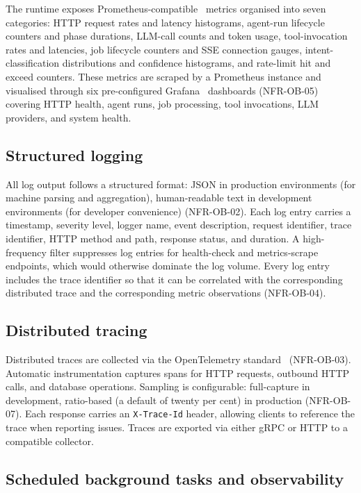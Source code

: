 \documentclass[a4paper,noexaminfo]{sapthesis}
\begin{document}
The runtime exposes Prometheus-compatible~\cite{prometheus2023} metrics
organised into seven categories: HTTP request rates and latency
histograms, agent-run lifecycle counters and phase durations, LLM-call
counts and token usage, tool-invocation rates and latencies, job
lifecycle counters and SSE connection gauges, intent-classification
distributions and confidence histograms, and rate-limit hit and exceed
counters.  These metrics are scraped by a Prometheus instance and
visualised through six pre-configured Grafana~\cite{grafana2023}
dashboards (NFR-OB-05) covering HTTP health, agent runs, job processing,
tool invocations, LLM providers, and system health.

\subsection{Structured logging}

All log output follows a structured format: JSON in production
environments (for machine parsing and aggregation), human-readable text in
development environments (for developer convenience) (NFR-OB-02).  Each
log entry carries a timestamp, severity level, logger name, event
description, request identifier, trace identifier, HTTP method and path,
response status, and duration.  A high-frequency filter suppresses log
entries for health-check and metrics-scrape endpoints, which would
otherwise dominate the log volume.  Every log entry includes the trace
identifier so that it can be correlated with the corresponding distributed
trace and the corresponding metric observations (NFR-OB-04).

\subsection{Distributed tracing}

Distributed traces are collected via the OpenTelemetry
standard~\cite{opentelemetry2023} (NFR-OB-03).  Automatic instrumentation captures spans for HTTP requests,
outbound HTTP calls, and database operations.  Sampling is
configurable: full-capture in development, ratio-based (a default of
twenty per cent) in production (NFR-OB-07).  Each response carries an
\texttt{X-Trace-Id} header, allowing clients to reference the trace when
reporting issues.  Traces are exported via either gRPC or HTTP to a
compatible collector.

\subsection{Scheduled background tasks and observability}
\label{sec:background-tasks}
\end{document}
